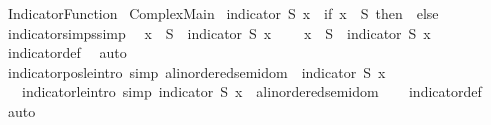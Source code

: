 %
\begin{isabellebody}%
\def\isabellecontext{Indicator{\isacharunderscore}Function}%
%
\isamarkuptrue%
%
\isadelimtheory
%
\endisadelimtheory
%
\isatagtheory
{}\isamarkupfalse%
\ Indicator{\isacharunderscore}Function\isanewline
{}\ Complex{\isacharunderscore}Main\isanewline
{}%
\endisatagtheory
{\isafoldtheory}%
%
\isadelimtheory
%
\endisadelimtheory
\isanewline
\isanewline
{}\isamarkupfalse%
\ {\isachardoublequoteopen}indicator\ S\ x\ {\isacharequal}\ {\isacharparenleft}if\ x\ {\isasymin}\ S\ then\ {}\ else\ {}{\isacharparenright}{\isachardoublequoteclose}\isanewline
\isanewline
{}\isamarkupfalse%
\ indicator{\isacharunderscore}simps{\isacharbrackleft}simp{\isacharbrackright}{\isacharcolon}\isanewline
\ \ {\isachardoublequoteopen}x\ {\isasymin}\ S\ {\isasymLongrightarrow}\ indicator\ S\ x\ {\isacharequal}\ {}{\isachardoublequoteclose}\isanewline
\ \ {\isachardoublequoteopen}x\ {\isasymnotin}\ S\ {\isasymLongrightarrow}\ indicator\ S\ x\ {\isacharequal}\ {}{\isachardoublequoteclose}\isanewline
%
\isadelimproof
\ \ %
\endisadelimproof
%
\isatagproof
{}\isamarkupfalse%
\ indicator{\isacharunderscore}def\ \isamarkupfalse%
\ auto%
\endisatagproof
{\isafoldproof}%
%
\isadelimproof
\isanewline
%
\endisadelimproof
\isanewline
{}\isamarkupfalse%
\ indicator{\isacharunderscore}pos{\isacharunderscore}le{\isacharbrackleft}intro{\isacharcomma}\ simp{\isacharbrackright}{\isacharcolon}\ {\isachardoublequoteopen}{\isacharparenleft}{}{\isacharcolon}{\isacharcolon}{\isacharprime}a{\isacharcolon}{\isacharcolon}linordered{\isacharunderscore}semidom{\isacharparenright}\ {\isasymle}\ indicator\ S\ x{\isachardoublequoteclose}\isanewline
\ \ \ indicator{\isacharunderscore}le{\isacharunderscore}{}{\isacharbrackleft}intro{\isacharcomma}\ simp{\isacharbrackright}{\isacharcolon}\ {\isachardoublequoteopen}indicator\ S\ x\ {\isasymle}\ {\isacharparenleft}{}{\isacharcolon}{\isacharcolon}{\isacharprime}a{\isacharcolon}{\isacharcolon}linordered{\isacharunderscore}semidom{\isacharparenright}{\isachardoublequoteclose}\isanewline
%
\isadelimproof
\ \ %
\endisadelimproof
%
\isatagproof
{}\isamarkupfalse%
\ indicator{\isacharunderscore}def\ \isamarkupfalse%
\ auto%
\endisatagproof
{\isafoldproof}%
%
\isadelimproof
\isanewline
%
\endisadelimproof

\end{isabellebody}
